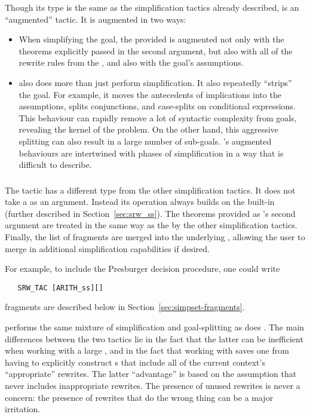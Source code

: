 Though its type is the same as the simplification tactics already
described,  is an ``augmented'' tactic.  It is augmented
in two ways:
\begin{itemize}
\item When simplifying the goal, the provided \simpset{} is augmented
  not only with the theorems explicitly passed in the second argument,
  but also with all of the rewrite rules from the , and
  also with the goal's assumptions.
%
\item {} also does more than just perform simplification.
  It also repeatedly ``strips'' the goal.  For example, it moves the
  antecedents of implications into the assumptions, splits
  conjunctions, and case-splits on conditional expressions.  This
  behaviour can rapidly remove a lot of syntactic complexity from
  goals, revealing the kernel of the problem.  On the other hand, this
  aggressive splitting can also result in a large number of
  sub-goals.  's augmented behaviours are intertwined with
  phases of simplification in a way that is difficult to describe.
\end{itemize}

\subsubsection{}

The tactic  has a different type from the other
simplification tactics.  It does not take a \simpset{} as an argument.
Instead its operation always builds on the built-in \simpset{}
 (further described in Section~\ref{sec:srw_ss}).  The
theorems provided as 's second argument are treated in
the same way as the by the other simplification tactics.  Finally, the
list of \simpset{} fragments are merged into the underlying
\simpset{}, allowing the user to merge in additional simplification
capabilities if desired.

For example, to include the Presburger decision procedure, one could
write
\begin{verbatim}
   SRW_TAC [ARITH_ss][]
\end{verbatim}
\Simpset{} fragments are described below in
Section~\ref{sec:simpset-fragments}.

 performs the same mixture of simplification and
goal-splitting as does .  The main differences between the
two tactics lie in the fact that the latter can be inefficient when
working with a large , and in the fact that working with
 saves one from having to explicitly construct
\simpset{}s that include all of the current context's ``appropriate''
rewrites.  The latter ``advantage'' is based on the assumption that
 never includes inappropriate rewrites.  The presence
of unused rewrites is never a concern: the presence of rewrites that
do the wrong thing can be a major irritation.


